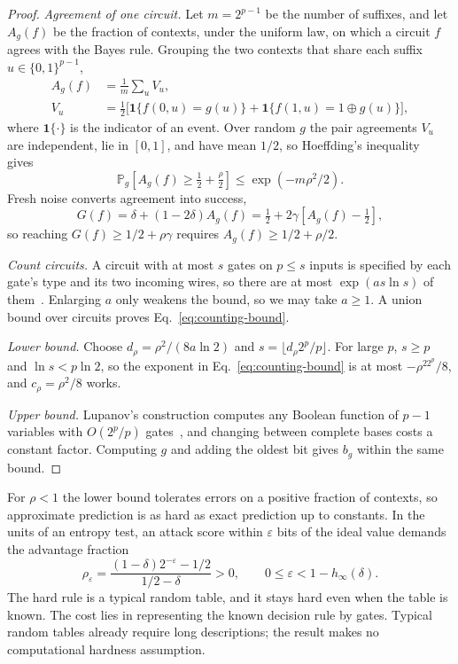 \documentclass[11pt,a4paper]{article}
\newcommand{\bits}{\{0,1\}}
\newcommand{\PP}{\mathbb{P}}
\newcommand{\I}{\mathbf{1}}
\begin{document}
\begin{proof}
\emph{Agreement of one circuit.} Let \(m=2^{p-1}\) be the number of suffixes, and let \(A_g(f)\) be the fraction of contexts, under the uniform law, on which a circuit \(f\) agrees with the Bayes rule. Grouping the two contexts that share each suffix \(u\in\bits^{p-1}\),
\[
\begin{aligned}
A_g(f)&=\frac1m\sum_u V_u,\\
V_u&=\tfrac12\bigl[\I\{f(0,u)=g(u)\}+\I\{f(1,u)=1\oplus g(u)\}\bigr],
\end{aligned}
\]
where \(\I\{\cdot\}\) is the indicator of an event. Over random \(g\) the pair agreements \(V_u\) are independent, lie in \([0,1]\), and have mean \(1/2\), so Hoeffding's inequality~\cite{hoeffding1963inequalities} gives
\[
\PP_g\!\left[A_g(f)\ge\tfrac12+\tfrac\rho2\right]\le\exp(-m\rho^2/2).
\]
Fresh noise converts agreement into success,
\begin{equation}
G(f)=\delta+(1-2\delta)A_g(f)
=\tfrac12+2\gamma\!\left[A_g(f)-\tfrac12\right],
\label{eq:agreement}
\end{equation}
so reaching \(G(f)\ge1/2+\rho\gamma\) requires \(A_g(f)\ge1/2+\rho/2\).

\emph{Count circuits.} A circuit with at most \(s\) gates on \(p\le s\) inputs is specified by each gate's type and its two incoming wires, so there are at most \(\exp(a s\ln s)\) of them~\cite{shannon1949synthesis,jukna2012boolean}. Enlarging \(a\) only weakens the bound, so we may take \(a\ge1\). A union bound over circuits proves Eq.~\eqref{eq:counting-bound}.

\emph{Lower bound.} Choose \(d_\rho=\rho^2/(8a\ln2)\) and \(s=\lfloor d_\rho2^p/p\rfloor\). For large \(p\), \(s\ge p\) and \(\ln s<p\ln2\), so the exponent in Eq.~\eqref{eq:counting-bound} is at most \(-\rho^22^p/8\), and \(c_\rho=\rho^2/8\) works.

\emph{Upper bound.} Lupanov's construction computes any Boolean function of \(p-1\) variables with \(O(2^p/p)\) gates~\cite{jukna2012boolean}, and changing between complete bases costs a constant factor. Computing \(g\) and adding the oldest bit gives \(b_g\) within the same bound.
\end{proof}

For \(\rho<1\) the lower bound tolerates errors on a positive fraction of contexts, so approximate prediction is as hard as exact prediction up to constants. In the units of an entropy test, an attack score within \(\varepsilon\) bits of the ideal value demands the advantage fraction
\[
\rho_\varepsilon=\frac{(1-\delta)2^{-\varepsilon}-1/2}{1/2-\delta}>0,
\qquad 0\le\varepsilon<1-h_\infty(\delta).
\]
The hard rule is a typical random table, and it stays hard even when the table is known. The cost lies in representing the known decision rule by gates. Typical random tables already require long descriptions; the result makes no computational hardness assumption.
\end{document}
